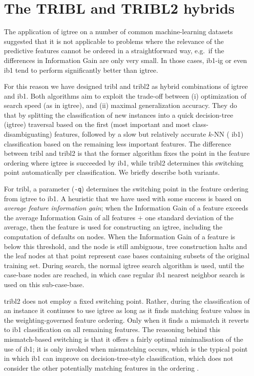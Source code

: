 \documentclass{report}
\begin{document}
\section{The TRIBL and TRIBL2 hybrids}
\label{tribl}

The application of {\sc igtree} on a number of common machine-learning
datasets suggested that it is not applicable to problems where the
relevance of the predictive features cannot be ordered in a
straightforward way, e.g.~if the differences in Information Gain are
only very small. In those cases, {\sc ib1-ig} or even {\sc ib1} tend
to perform significantly better than {\sc igtree}.

For this reason we have designed {\sc tribl} \cite{Daelemans+97d} and
{\sc tribl2} as hybrid combinations of {\sc igtree} and {\sc
ib1}. Both algorithms aim to exploit the trade-off between (i)
optimization of search speed (as in {\sc igtree}), and (ii) maximal
generalization accuracy. They do that by splitting the classification
of new instances into a quick decision-tree ({\sc igtree}) traversal
based on the first (most important and most class-disambiguating)
features, followed by a slow but relatively accurate $k$-NN ({\sc
ib1}) classification based on the remaining less important
features. The difference between {\sc tribl} and {\sc tribl2} is that
the former algorithm fixes the point in the feature ordering where
{\sc igtree} is succeeded by {\sc ib1}, while {\sc tribl2} determines
this switching point automatically per classification. We briefly
describe both variants.

For {\sc tribl}, a parameter ({\tt -q}) determines the switching point
in the feature ordering from {\sc igtree} to {\sc ib1}. A heuristic
that we have used with some success is based on {\em average feature
information gain}; when the Information Gain of a feature exceeds the
average Information Gain of all features $+$ one standard
deviation of the average, then the feature is used for constructing an
{\sc igtree}, including the computation of defaults on nodes. When the
Information Gain of a feature is below this threshold, and the node is
still ambiguous, tree construction halts and the leaf nodes at that
point represent case bases containing subsets of the original training
set. During search, the normal {\sc igtree} search algorithm is used,
until the case-base nodes are reached, in which case regular {\sc ib1}
nearest neighbor search is used on this sub-case-base. 

{\sc tribl2} does not employ a fixed switching point. Rather, during
the classification of an instance it continues to use {\sc igtree} as
long as it finds matching feature values in the weighting-governed
feature ordering. Only when it finds a mismatch it reverts to {\sc
ib1} classification on all remaining features. The reasoning behind
this mismatch-based switching is that it offers a fairly optimal
minimalisation of the use of {\sc ib1}; it is only invoked when
mismatching occurs, which is the typical point in which {\sc ib1} can
improve on decision-tree-style classification, which does not consider
the other potentially matching features in the ordering
\cite{Daelemans+99}.
\end{document}
